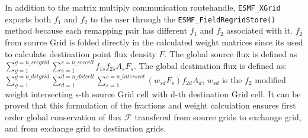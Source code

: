 In addition to the matrix multiply communication routehandle, 
{\tt ESMF\_XGrid} exports both $f_1$ and $f_2$ to the user through the {\tt ESMF\_FieldRegridStore()} method
because each remapping pair has different $f_1$ and $f_2$ associated with it. $f_2$ from source Grid is 
folded directly in the calculated weight matrices since its used to calculate destination point flux
density $F$. The global source flux is defined as $\sum_{g=1}^{g=n\_srcgrid}\sum_{s=1}^{s=n\_srccell}{ f_{1s} f_{2s} A_s F_s }$.
The global destination flux is defined as: 
$\sum_{g=1}^{g=n\_dstgrid}\sum_{d=1}^{d=n\_dstcell}{ \sum_{s=1}^{s=n\_intersect}(w_{sd} F_s) f_{2d} A_d}$, $w_{sd}$ is the
$f_2$ modified weight intersecting s-th source Grid cell with d-th destination Grid cell.
It can be proved that this formulation of the fractions and 
weight calculation ensures first order global conservation of
flux $\mathcal{F}$ transfered from source grids to exchange grid, and from exchange grid to destination grids.

